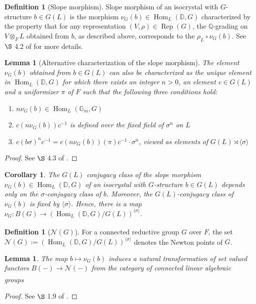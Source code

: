 \documentclass[11pt,a4paper]{article}
\theoremstyle{definition}
\newtheorem{D}[shared]{Definition}
\theoremstyle{plain}
\newtheorem{Le}[shared]{Lemma}
\newtheorem{C}[shared]{Corollary}
\theoremstyle{remark}
\theoremstyle{plain}
\DeclareMathOperator{\Rep}{Rep}
\DeclareMathOperator{\Hom}{Hom}
\begin{document}
\begin{D}[Slope morphism]\label{slopedef}
    Slope morphism of an isocrystal with $G$-structure $b \in G(L)$ is the morphism $\nu_G(b) \in \Hom_L(\mathbb{D}, G)$ characterized by the property that for any representation $(V, \rho) \in \Rep(G)$, the $\mathbb{Q}$-grading on $V \otimes_F L$ obtained from $b$, as described above, corresponds to the $\rho_L \circ \nu_G(b)$. See $\S$ 4.2 of \cite{MR809866} for more details.
\end{D}

\begin{Le}[Alternative characterization of the slope morphism]\label{slopealternativedef}
    The element $\nu_G(b)$ obtained from $b \in G(L)$ can also be characterized as the unique element in $\Hom_L(\mathbb{D}, G)$ for which there exists an integer $n > 0$, an element $c \in G(L)$ and a uniformizer $\pi$ of $F$ such that the following three conditions hold:
\begin{enumerate}
    \item $n\nu_G(b) \in \Hom_L(\mathbb{G}_m, G)$
    \item $c (n\nu_G(b)) c^{-1}$ is defined over the fixed field of $\sigma^n$ on $L$
    \item $c (b\sigma)^nc^{-1} = c (n\nu_G(b))(\pi)c^{-1} \cdot  \sigma^n$, viewed as elements of $G(L) \rtimes \langle \sigma \rangle $
\end{enumerate}
\end{Le}
\begin{proof}
    See $\S$ 4.3 of \cite{MR809866}.
\end{proof}

\begin{C}\label{slopebg}
    The $G(L)$ conjugacy class of the slope morphism $\nu_G(b) \in \Hom_L(\mathbb{D}, G)$ of an isocrystal with $G$-structure $b \in G(L)$ depends only on the $\sigma$-conjugacy class of $b$. Moreover, the $G(L)$-conjugacy class of $\nu_G(b)$ is fixed by $\langle \sigma \rangle$. Hence, there is a map $\nu_G:  B(G) \xrightarrow[]{} (\Hom_L(\mathbb{D}, G)/G(L))^{\langle \sigma \rangle}$.
\end{C}

\begin{D}[$\mathcal{N}(G)$]
    For a connected reductive group $G$ over $F$, the set $\mathcal{N}(G) := (\Hom_L(\mathbb{D}, G)/G(L))^{\langle \sigma \rangle}$ denotes the Newton points of $G$.
\end{D}


\begin{Le}\label{slopefunctoriality}
    The map $b \mapsto \nu_G(b)$ induces a natural transformation of set valued functors $B(-) \xrightarrow[]{} \mathcal{N}(-)$ from the category of connected linear algebraic groups
\end{Le}
\begin{proof}
    See $\S$ 1.9 of \cite{MR1411570}.
\end{proof}
\end{document}
